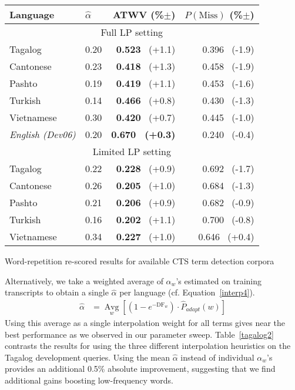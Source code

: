 \documentclass[11pt]{article}
\DeclareMathOperator*{\Avg}{Avg}
\begin{document}
\begin{table*}[!ht]
\centering
\begin{tabular}{l|l|r|r} \toprule
\bf Language & \bf $\widehat{\alpha}$ & \bf ATWV (\%$\pm$) & \bf $P(\mathrm{Miss})$ (\%$\pm$) \\\midrule
\multicolumn{4}{c}{Full LP setting} \\\midrule
Tagalog & 0.20 & \textbf{0.523} $\,$ (+1.1) & 0.396 $\,$ (-1.9)\\
Cantonese & 0.23 & \textbf{0.418 }$\,$ (+1.3) & 0.458 $\,$ (-1.9) \\
Pashto & 0.19 & \textbf{0.419} $\,$ (+1.1) & 0.453 $\,$ (-1.6) \\
Turkish & 0.14 & \textbf{0.466} $\,$ (+0.8) & 0.430 $\,$ (-1.3) \\
Vietnamese & 0.30 & \textbf{0.420} $\,$ (+0.7) & 0.445 $\,$ (-1.0) \\
\textit{English (Dev06)} & 0.20 & \bf 0.670 $\,$ (+0.3) & 0.240 $\,$ (-0.4) \\
\midrule
\multicolumn{4}{c}{Limited LP setting} \\
\midrule
Tagalog & 0.22 & \textbf{ 0.228} $\,$ (+0.9) & 0.692 $\,$ (-1.7)\\
Cantonese & 0.26 & \textbf{0.205} $\,$ (+1.0) & 0.684 $\,$ (-1.3) \\
Pashto & 0.21 & \textbf{0.206 }$\,$ (+0.9) & 0.682 $\,$ (-0.9) \\
Turkish & 0.16 & \textbf{0.202} $\,$ (+1.1) & 0.700 $\,$ (-0.8) \\
Vietnamese & 0.34 & \textbf{0.227} $\,$ (+1.0) & 0.646 $\,$ (+0.4) \\
\bottomrule
\end{tabular}
\begin{caption}{Word-repetition re-scored results for available CTS term detection corpora}
\label{alllangs}
\end{caption}
\end{table*}

Alternatively, we take a weighted average of $\alpha_w$'s estimated on training transcripts to obtain a single $\widehat{\alpha}$ per language (cf. Equation~\ref{interp4}).  
\begin{align}
\widehat{\alpha} &= \Avg\limits_w \left[ \left( 1-e^{-\mathrm{DF}_w} \right) \cdot \widehat{P}_{adapt}(w) \right]
\label{interp4}
\end{align}
\noindent Using this average as a single interpolation weight for all terms gives near the best performance as we observed in our parameter sweep.  Table~\ref{tagalog2} contrasts the results for using the three different interpolation heuristics on the Tagalog development queries.   Using the mean $\widehat{\alpha}$ instead of individual $\alpha_w$'s provides an additional 0.5\% absolute improvement, suggesting that we find additional gains boosting low-frequency words.
\end{document}
